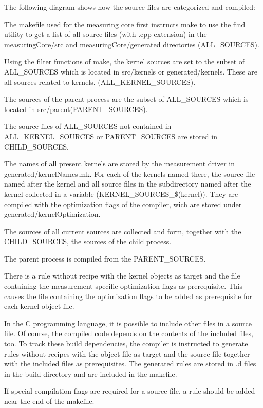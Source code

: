 \documentclass[a4paper,12pt]{article}
\newlength{\imgwidth}
\newcommand{\umlDiagram}[1]{%
	\settowidth{\imgwidth}{\texttt{[image: out/diagrams/\#1.pdf]}}%
	\setlength{\imgwidth}{\minof{0.5\imgwidth}{\textwidth}}%
	\par\vskip0.5cm\noindent\makebox[\textwidth][c]{%
	\texttt{[image: out/diagrams/\#1.pdf]}%
}\vskip0.5cm}
\begin{document}
The following diagram shows how the source files are categorized and compiled:

\umlDiagram{MeasuringCoreBuild}

The makefile used for the measuring core first instructs make to use the find
utility to get a list of all source files (with .cpp extension) in the
measuringCore/src and measuringCore/generated directories (ALL\_SOURCES).

Using the filter functions of make, the kernel sources are set to the subset of
ALL\_SOURCES which is located in src/kernels or generated/kernels. These are all sources related to kernels.
(ALL\_KERNEL\_SOURCES).

The sources of the parent process are the subset of ALL\_SOURCES which is
located in src/parent(PARENT\_SOURCES).

The source files of ALL\_SOURCES not contained in ALL\_KERNEL\_SOURCES or
PARENT\_SOURCES are stored in CHILD\_SOURCES.

The names of all present kernels are stored by the measurement driver in
generated/kernelNames.mk. For each of the kernels named there, the source file
named after the kernel and all source files in the subdirectory named after the
kernel collected in a variable (KERNEL\_SOURCES\_\$(kernel)). They are compiled
with the optimization flags of the compiler, wich are stored under
generated/kernelOptimization.

The sources of all current sources are collected and form, together with the
CHILD\_SOURCES, the sources of the child process.

The parent process is compiled from the PARENT\_SOURCES.

There is a rule without recipe with the kernel objects as target and the file
containing the measurement specific optimization flags as prerequisite. This
causes the file containing the optimization flags to be added as prerequisite
for each kernel object file.

In the C programming language, it is possible to include other files in a source
file. Of course, the compiled code depends on the contents of the included
files, too. To track these build dependencies, the compiler is instructed to
generate rules without recipes with the object file as target and the source
file together with the included files as prerequisites. The generated rules are
stored in .d files in the build directory and are included in the makefile.

If special compilation flags are required for a source file, a rule should be
added near the end of the makefile.
\end{document}
